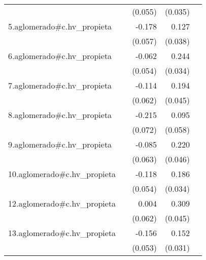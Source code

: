 {\begin{longtable}{l*{4}{D{.}{.}{-1}}}
            &                     &     (0.055)         &     (0.035)         &                     \\
\addlinespace
5.aglomerado#c.hv\_propieta&                     &      -0.178\sym{**} &       0.127\sym{***}&                     \\
            &                     &     (0.057)         &     (0.038)         &                     \\
\addlinespace
6.aglomerado#c.hv\_propieta&                     &      -0.062         &       0.244\sym{***}&                     \\
            &                     &     (0.054)         &     (0.034)         &                     \\
\addlinespace
7.aglomerado#c.hv\_propieta&                     &      -0.114         &       0.194\sym{***}&                     \\
            &                     &     (0.062)         &     (0.045)         &                     \\
\addlinespace
8.aglomerado#c.hv\_propieta&                     &      -0.215\sym{**} &       0.095         &                     \\
            &                     &     (0.072)         &     (0.058)         &                     \\
\addlinespace
9.aglomerado#c.hv\_propieta&                     &      -0.085         &       0.220\sym{***}&                     \\
            &                     &     (0.063)         &     (0.046)         &                     \\
\addlinespace
10.aglomerado#c.hv\_propieta&                     &      -0.118\sym{*}  &       0.186\sym{***}&                     \\
            &                     &     (0.054)         &     (0.034)         &                     \\
\addlinespace
12.aglomerado#c.hv\_propieta&                     &       0.004         &       0.309\sym{***}&                     \\
            &                     &     (0.062)         &     (0.045)         &                     \\
\addlinespace
13.aglomerado#c.hv\_propieta&                     &      -0.156\sym{**} &       0.152\sym{***}&                     \\
            &                     &     (0.053)         &     (0.031)         &                     \\

\end{longtable}}
